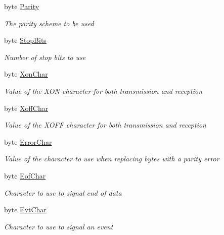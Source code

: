 \begin{DoxyCompactItemize}
byte \mbox{\hyperlink{struct_r_j_c_p_1_1_i_o_1_1_ports_1_1_native_1_1_windows_1_1_native_methods_1_1_d_c_b_a76880d1d2a52cefc1c2ef18d75d540fb}{Parity}}
\begin{DoxyCompactList}\small\item\em The parity scheme to be used \end{DoxyCompactList}\item 
byte \mbox{\hyperlink{struct_r_j_c_p_1_1_i_o_1_1_ports_1_1_native_1_1_windows_1_1_native_methods_1_1_d_c_b_adb5ff1d18103c1e5becd1f706487cb43}{Stop\+Bits}}
\begin{DoxyCompactList}\small\item\em Number of stop bits to use \end{DoxyCompactList}\item 
byte \mbox{\hyperlink{struct_r_j_c_p_1_1_i_o_1_1_ports_1_1_native_1_1_windows_1_1_native_methods_1_1_d_c_b_ae48293fae4f000fc989d4983d5f60978}{Xon\+Char}}
\begin{DoxyCompactList}\small\item\em Value of the X\+ON character for both transmission and reception \end{DoxyCompactList}\item 
byte \mbox{\hyperlink{struct_r_j_c_p_1_1_i_o_1_1_ports_1_1_native_1_1_windows_1_1_native_methods_1_1_d_c_b_af1e5d046f93cf66b8a5f4247bc7f0663}{Xoff\+Char}}
\begin{DoxyCompactList}\small\item\em Value of the X\+O\+FF character for both transmission and reception \end{DoxyCompactList}\item 
byte \mbox{\hyperlink{struct_r_j_c_p_1_1_i_o_1_1_ports_1_1_native_1_1_windows_1_1_native_methods_1_1_d_c_b_a0871c2bbb72e3a0f32b7defa1106b58b}{Error\+Char}}
\begin{DoxyCompactList}\small\item\em Value of the character to use when replacing bytes with a parity error \end{DoxyCompactList}\item 
byte \mbox{\hyperlink{struct_r_j_c_p_1_1_i_o_1_1_ports_1_1_native_1_1_windows_1_1_native_methods_1_1_d_c_b_a04a1c7390ae4f3e2bfdabb34ccd0c8d7}{Eof\+Char}}
\begin{DoxyCompactList}\small\item\em Character to use to signal end of data \end{DoxyCompactList}\item 
byte \mbox{\hyperlink{struct_r_j_c_p_1_1_i_o_1_1_ports_1_1_native_1_1_windows_1_1_native_methods_1_1_d_c_b_aa4f5bd91dfa217cb0f043483cf06ea68}{Evt\+Char}}
\begin{DoxyCompactList}\small\item\em Character to use to signal an event \end{DoxyCompactList}\end{DoxyCompactItemize}


